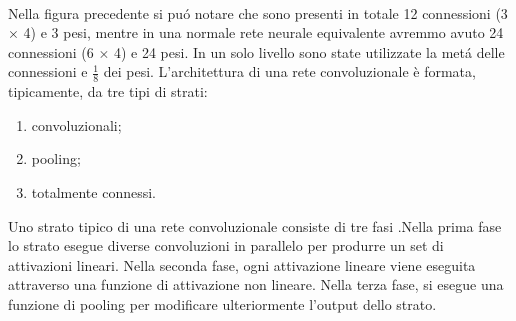 \documentclass[a4paper,12pt]{report}
\begin{document}
\\Nella figura precedente si pu\'{o} notare che sono presenti in totale 12 connessioni (3$\times$ 4) e 3 pesi, mentre in una normale rete neurale equivalente avremmo avuto 24 connessioni (6 $\times$ 4) e 24 pesi. In un solo livello sono state utilizzate la met\'{a} delle connessioni e $\frac{1}{8}$ dei pesi.
\newpage
L'architettura di una rete convoluzionale \`e formata, tipicamente, da tre tipi di strati:
\begin{enumerate}
\item convoluzionali;
\item pooling;
\item totalmente connessi.
\end{enumerate}
Uno strato tipico di una rete convoluzionale consiste di tre fasi .Nella prima fase lo strato esegue diverse convoluzioni in parallelo per produrre un set di attivazioni lineari. Nella seconda fase, ogni attivazione lineare viene eseguita attraverso una funzione di attivazione non lineare. Nella terza fase, si esegue  una funzione di  pooling per modificare ulteriormente l'output dello strato.
\end{document}

